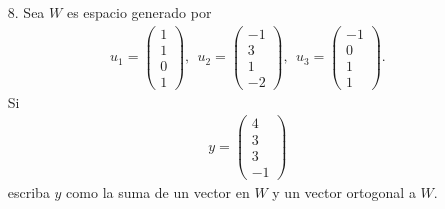 \documentclass[11pt,letterpaper]{article}
\begin{document}
\begin{itemize}
\item[8.] Sea $W$ es espacio generado por 
\begin{align*}
u_1=\begin{pmatrix} 1\\ 1\\ 0 \\ 1 \end{pmatrix}, \ \ 
u_2=\begin{pmatrix} -1\\ 3 \\ 1 \\ -2\end{pmatrix}, \ \ 
u_3=\begin{pmatrix} -1\\ 0 \\ 1\\1 \end{pmatrix}.
\end{align*}
Si 
\begin{align*}
y=\begin{pmatrix}
4\\ 3\\ 3\\-1
\end{pmatrix}
\end{align*}
escriba $y$ como la suma de un vector en $W$ y un vector ortogonal a $W$.


\end{itemize}
\end{document}
